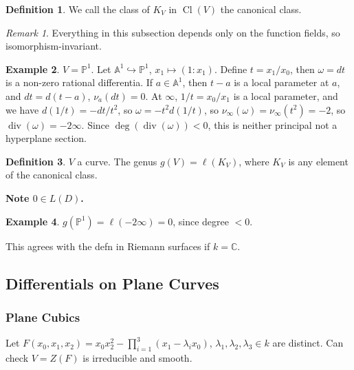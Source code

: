 \documentclass{article}
\theoremstyle{definition}
\newtheorem{defn}{Definition}[section]
\newtheorem{example}[defn]{Example}
\theoremstyle{remark}
\newtheorem{rem}{Remark}
\theoremstyle{plain}
\newcommand{\CC}{\mathbb{C}}
\newcommand{\PP}{\mathbb{P}}
\newcommand{\bA}{\mathbb{A}}
\newcommand{\cl}{\operatorname{Cl}}
\newcommand{\divi}{\operatorname{div}}
\begin{document}
\begin{defn}
    We call the class of $K_V$ in $\cl(V)$ the canonical class.
\end{defn}
\begin{rem}
    Everything in this subsection depends only on the function fields, so isomorphism-invariant.
\end{rem}
\begin{example}
    $V=\PP^1$. Let $\bA^1\hookrightarrow\PP^1$, $x_1\mapsto (1:x_1)$. Define $t=x_1/x_0$, then $\omega=dt$ is a non-zero rational differentia. If $a\in \bA^1$, then $t-a$ is a local parameter at $a$, and $dt=d(t-a)$, $\nu_a(dt)=0$. At $\infty$, $1/t=x_0/x_1$ is a local parameter, and we have $d(1/t)=-dt/t^2$, so $\omega=-t^2d(1/t)$, so $\nu_\infty(\omega)=\nu_\infty(t^2)=-2$, so $\divi(\omega)=-2\infty$. Since $\deg(\divi(\omega))<0$, this is neither principal not a hyperplane section.
\end{example}
\begin{defn}
    $V$ a curve. The genus $g(V)=\ell(K_V)$, where $K_V$ is any element of the canonical class.
\end{defn}
\textbf{Note $0\in L(D)$.}
\begin{example}
    $g(\PP^1)=\ell(-2\infty)=0$, since degree $<0$.
\end{example}
This agrees with the defn in Riemann surfaces if $k=\CC$.
\subsection{Differentials on Plane Curves}
\subsubsection{Plane Cubics}
Let $F(x_0,x_1,x_2)=x_0x_2^2-\prod_{i=1}^3(x_1-\lambda_ix_0)$, $\lambda_1,\lambda_2,\lambda_3\in k$ are distinct. Can check $V=Z(F)$ is irreducible and smooth.
\end{document}
